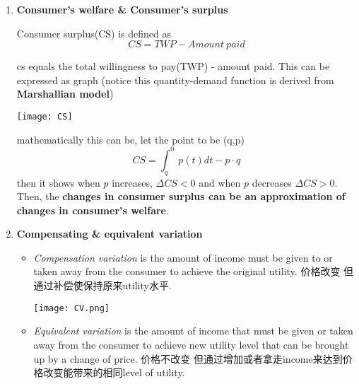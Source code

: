 \documentclass[10pt]{article}
\newenvironment{changemargin}[2]{%
  \begin{list}{}{%
    \setlength{\topsep}{0pt}%
    \setlength{\leftmargin}{#1}%
    \setlength{\rightmargin}{#2}%
    \setlength{\listparindent}{\parindent}%
    \setlength{\itemindent}{\parindent}%
    \setlength{\parsep}{\parskip}%
  }%
  \item[]}{\end{list}}
\begin{document}
\begin{changemargin}{-0.125in}{0in}
\begin{enumerate}
\begin{enumerate}
                \end{enumerate}
                
                \medskip
                
             \item 
             \textbf{Consumer's welfare \& Consumer's surplus}
                 
                 \smallskip
                 
                 Consumer surplus(CS) is defined as 
                 \[
                 CS = TWP - Amount\:paid
                 \]
              
                 cs equals the total willingness to pay(TWP) - amount paid. This can be expressed as graph (notice this quantity-demand function is derived from \textbf{Marshallian model})
                 
                 \medskip
                  
                 \begin{center}
                 	\texttt{[image: CS]}
                 \end{center}
                 
                 mathematically this can be, let the point to be (q,p)
                 \[
                 CS = \int^0_q\:p(t)dt - p\cdot q
                 \]  
                 then it shows when $p$ increases, $\Delta CS< 0$ and when $p$ decreases $\Delta CS >0$. Then, the \textbf{changes in consumer surplus can be an approximation of changes in consumer's welfare}. 
                 
                 \bigskip
                 
                 \item
                 
                 \textbf{Compensating \& equivalent variation}
                 
                 \smallskip
                 
                 \begin{itemize}
                 	\item \textit{Compensation variation} \:\:is the amount of income must be given to or taken away from the consumer to achieve the original utility. 价格改变 但通过补偿使保持原来utility水平.
                 	     \begin{center}
                  	     \texttt{[image: CV.png]}
                         \end{center}
                 	\item \textit{Equivalent variation} \:\: is the amount of income that must be given or taken away from the consumer to achieve new utility level that can be brought up by a change of price. 价格不改变 但通过增加或者拿走income来达到价格改变能带来的相同level of utility.
                  

\end{itemize}
\end{enumerate}
\end{changemargin}
\end{document}
